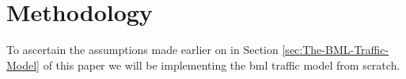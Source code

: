 \section{Methodology}
\label{sec:Methodology}
To ascertain the assumptions made earlier on in Section \ref{sec:The-BML-Traffic-Model} of this paper we will be implementing the \gls{bml} traffic model from scratch.